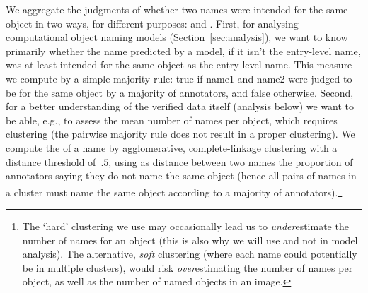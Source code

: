 We aggregate the judgments of whether two names were intended for the same object in two ways, for different purposes: \sameobject and \cluster.
First, for analysing computational object naming models (Section~\ref{sec:analysis}), 
we want to know primarily whether the name predicted by a model, if it isn't the entry-level name, was at least intended for the same object as the entry-level name.
This \textbf{\sameobject} measure we compute by a simple majority rule: true if name1 and name2 were judged to be for the same object by a majority of annotators, and false otherwise.
Second, for a better understanding of the verified \mn data itself (analysis below) we want to be able, e.g., to assess the mean number of names per object, which requires clustering (the pairwise majority rule does not result in a proper clustering). 
We compute the \textbf{\cluster} of a name by agglomerative, complete-linkage clustering with a distance threshold of~$.5$, using as distance between two names the proportion of annotators saying they do not name the same object (hence all pairs of names in a cluster must name the same object according to a majority of annotators).\footnote{
	The `hard' clustering we use may occasionally lead us to \emph{under}estimate the number of names for an object (this is also why we will use \sameobject and not \cluster in model analysis). The alternative, \emph{soft} clustering (where each name could potentially be in multiple clusters), would risk \emph{over}estimating the number of names per object, as well as the number of named objects in an image.
}





